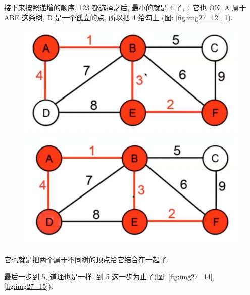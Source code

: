 接下来按照递增的顺序, 123 都选择之后, 最小的就是 4 了, 4 它也 OK. A 属于 ABE 这条树, D 是一个孤立的点, 所以把 4 给勾上 (图: \ref{fig:img27_12}, \ref{fig:img27_13}). 

\begin{figure}[ht]
  \centering
  \begin{minipage}[t]{0.4\textwidth}
    \centering
    \caption{}
    \label{fig:img27_12}
    \includegraphics[width=\textwidth]{asset/90cfb2e1-d182-4637-a969-08136f9db0f3.jpg}
  \end{minipage}%
  \hspace{1em}
  \begin{minipage}[t]{0.4\textwidth}
    \centering
    \caption{}
    \label{fig:img27_13}
    \includegraphics[width=\textwidth]{asset/0d6a03e3-624d-4dfc-a8b8-ee7bc651cf5a.jpg}
  \end{minipage}
\end{figure}

它也就是把两个属于不同树的顶点给它结合在一起了. 

最后一步到 5, 道理也是一样, 到 5 这一步为止了(图: \ref{fig:img27_14}, \ref{fig:img27_15}): 

